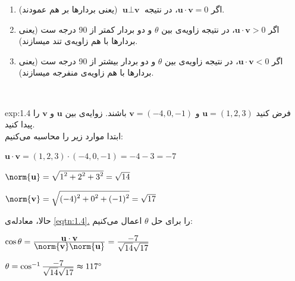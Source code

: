{\begin{spacing}{1.5}
        \begin{enumerate}[label=\textbf{\arabic*}.]
            \item {اگر $\textbf{u}\cdot\textbf{v}=0$، در نتیجه $\textbf{u}\perp\textbf{v}$ (یعنی بردار‌ها بر هم عمودند).}
            \item {اگر $\textbf{u}\cdot\textbf{v}>0$، در نتیجه زاویه‌ی بین $\theta$ و دو بردار کمتر از 90 درجه ست (یعنی بردار‌ها با هم زاویه‌ی تند میسازند).}
            \item {اگر $\textbf{u}\cdot\textbf{v}<0$، در نتیجه زاویه‌ی بین $\theta$ و دو بردار بیشتر از 90 درجه ست (یعنی بردار‌ها با هم زاویه‌ی منفرجه میسازند).}
        \end{enumerate} \\

        \begin{example}{exp:1.4}
            فرض کنید $\textbf{u}=(1,2,3)$ و $\textbf{v}=(-4,0,-1)$ باشند. زوایه‌ی بین $\textbf{u}$ و $\textbf{v}$ را پیدا کنید. \\
            ابتدا موارد زیر را محاسبه می‌کنیم:

            \begin{center}
                $\textbf{u}\cdot\textbf{v}=(1,2,3)\cdot(-4,0,-1)=-4-3=-7$

                $\norm{\textbf{u}}=\sqrt{\displaystyle 1^2+2^2+3^2}=\sqrt{\displaystyle 14}$

                $\norm{\textbf{v}}=\sqrt{\displaystyle (-4)^2+0^2+(-1)^2}=\sqrt{\displaystyle 17}$
            \end{center}

            حالا، معادله‌ی \hyperref[eqtn:1.4]{\ref{eqtn:1.4}.} را برای حل $\theta$ اعمال می‌کنیم:

            \begin{center}
                $\cos\theta=\frac{\displaystyle\textbf{u}\cdot\textbf{v}}{\displaystyle\norm{\textbf{v}}\norm{\textbf{u}}}=\frac{\displaystyle -7}{\displaystyle \sqrt{\displaystyle 14}\sqrt{\displaystyle 17}}$

                $\theta=\cos^{-1}\frac{\displaystyle -7}{\displaystyle \sqrt{\displaystyle 14}\sqrt{\displaystyle 17}}\thickapprox 117^\circ$
            \end{center}
        \end{example}


\end{spacing}}
